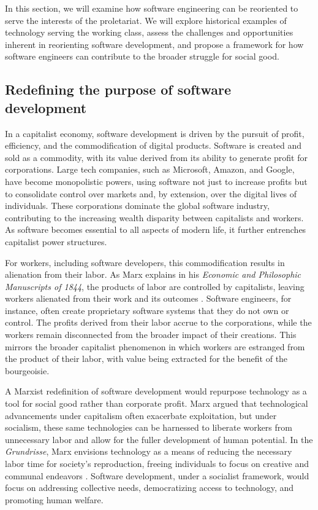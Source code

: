 \begin{refsection}
In this section, we will examine how software engineering can be reoriented to serve the interests of the proletariat. We will explore historical examples of technology serving the working class, assess the challenges and opportunities inherent in reorienting software development, and propose a framework for how software engineers can contribute to the broader struggle for social good.

\subsection{Redefining the purpose of software development}

In a capitalist economy, software development is driven by the pursuit of profit, efficiency, and the commodification of digital products. Software is created and sold as a commodity, with its value derived from its ability to generate profit for corporations. Large tech companies, such as Microsoft, Amazon, and Google, have become monopolistic powers, using software not just to increase profits but to consolidate control over markets and, by extension, over the digital lives of individuals. These corporations dominate the global software industry, contributing to the increasing wealth disparity between capitalists and workers. As software becomes essential to all aspects of modern life, it further entrenches capitalist power structures.

For workers, including software developers, this commodification results in alienation from their labor. As Marx explains in his \textit{Economic and Philosophic Manuscripts of 1844}, the products of labor are controlled by capitalists, leaving workers alienated from their work and its outcomes \cite[pp.~79-80]{marx2018}. Software engineers, for instance, often create proprietary software systems that they do not own or control. The profits derived from their labor accrue to the corporations, while the workers remain disconnected from the broader impact of their creations. This mirrors the broader capitalist phenomenon in which workers are estranged from the product of their labor, with value being extracted for the benefit of the bourgeoisie.

A Marxist redefinition of software development would repurpose technology as a tool for social good rather than corporate profit. Marx argued that technological advancements under capitalism often exacerbate exploitation, but under socialism, these same technologies can be harnessed to liberate workers from unnecessary labor and allow for the fuller development of human potential. In the \textit{Grundrisse}, Marx envisions technology as a means of reducing the necessary labor time for society's reproduction, freeing individuals to focus on creative and communal endeavors \cite[pp.~705-707]{marx1993}. Software development, under a socialist framework, would focus on addressing collective needs, democratizing access to technology, and promoting human welfare.


\end{refsection}
